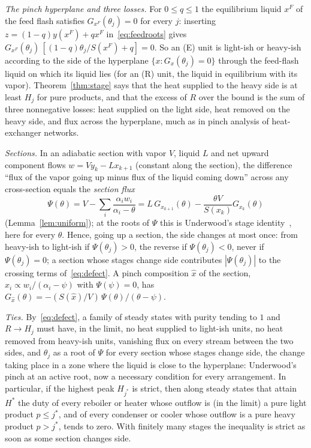 \documentclass[11pt,a4paper]{report}
\newcommand{\Hs}{H^{*}}
\begin{document}
\emph{The pinch hyperplane and three losses.} For \(0\le q\le1\) the equilibrium liquid \(x^F\) of the feed flash satisfies
\(G_{x^F}(\theta_j)=0\) for every \(j\): inserting \(z=(1-q)y(x^F)+qx^F\) in~\eqref{eq:feedroots} gives
\(G_{x^F}(\theta_j)\,[(1-q)\theta_j/S(x^F)+q]=0\). So an (E) unit is light-ish or heavy-ish according to the side of the
hyperplane \(\{x:G_x(\theta_j)=0\}\) through the feed-flash liquid on which its liquid lies (for an (R) unit, the liquid in
equilibrium with its vapor). Theorem~\ref{thm:stage} says that the heat supplied to the heavy side is at least \(H_j\) for pure
products, and that the excess of \(R\) over the bound is the sum of three nonnegative losses: heat supplied on the light
side, heat removed on the heavy side, and flux across the hyperplane, much as in pinch analysis of heat-exchanger networks.

\emph{Sections.} In an adiabatic section with vapor \(V\), liquid \(L\) and net upward component flows
\(w=Vy_k-Lx_{k+1}\) (constant along the section), the difference ``flux of the vapor going up minus flux of the liquid
coming down'' across any cross-section equals the \emph{section flux}
\begin{equation}\label{eq:sectionflux}
\Psi(\theta)=V-\sum_i\frac{\alpha_iw_i}{\alpha_i-\theta}=L\,G_{x_{k+1}}(\theta)-\frac{\theta V}{S(x_k)}G_{x_k}(\theta)
\end{equation}
(Lemma~\ref{lem:uniform}); at the roots of \(\Psi\) this is Underwood's stage identity~\autocite[eq.~(2.49)]{HalvorsenThesis},
here for every \(\theta\). Hence, going up a section, the side changes at most once: from heavy-ish to light-ish if
\(\Psi(\theta_j)>0\), the reverse if \(\Psi(\theta_j)<0\), never if \(\Psi(\theta_j)=0\); a section whose stages change side
contributes \(|\Psi(\theta_j)|\) to the crossing terms of~\eqref{eq:defect}. A pinch composition \(\hat x\) of the section,
\(\hat x_i\propto w_i/(\alpha_i-\psi)\) with \(\Psi(\psi)=0\), has \(G_{\hat x}(\theta)=-(S(\hat x)/V)\,\Psi(\theta)/(\theta-\psi)\).

\emph{Ties.} By~\eqref{eq:defect}, a family of steady states with purity tending to \(1\) and \(R\to H_j\) must have, in the
limit, no heat supplied to light-ish units, no heat removed from heavy-ish units, vanishing flux on every stream between
the two sides, and \(\theta_j\) as a root of \(\Psi\) for every section whose stages change side, the change taking place in a
zone where the liquid is close to the hyperplane: Underwood's pinch at an active root, now a necessary condition for
every arrangement. In particular, if the highest peak \(H_{j^*}\) is strict, then along steady states that attain \(\Hs\) the duty
of every reboiler or heater whose outflow is (in the limit) a pure light product \(p\le j^*\), and of every condenser or
cooler whose outflow is a pure heavy product \(p>j^*\), tends to zero. With finitely many stages the inequality is strict as soon as some section changes side.
\end{document}
